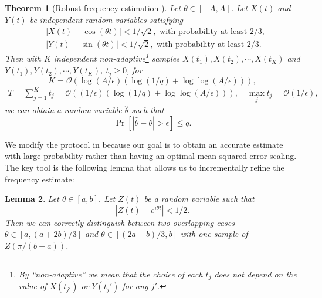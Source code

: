\documentclass[twocolumn,superscriptaddress,aps,showpacs,amsmath,amstex,amssymb,citeautoscript,floatfix,pra,preprintnumbers]{revtex4-2}
\newtheorem{theorem}{Theorem}
\newtheorem{lemma}[theorem]{Lemma}
\theoremstyle{plain}
\theoremstyle{plain}
\theoremstyle{plain}
\theoremstyle{plain}
\theoremstyle{plain}
\theoremstyle{plain}
\begin{document}
\begin{appendix}
\begin{theorem}[Robust frequency estimation \cite{ma2024learningkbodyhamiltonianscompressed}]
    \label{thm:robust_frequency_estimation}
    Let $\theta\in[-A,A]$.
    Let $X(t)$ and $Y(t)$ be independent random variables satisfying
    \begin{equation}
        \begin{aligned}
            &|X(t)-\cos(\theta t)|< 1/\sqrt{2}, \text{ with probability at least }2/3, \\
            &|Y(t)-\sin(\theta t)|< 1/\sqrt{2}, \text{ with probability at least }2/3.
        \end{aligned}
    \end{equation}
    Then with $K$ independent non-adaptive\footnote{By ``non-adaptive'' we mean that the choice of each $t_j$ does not depend on the value of $X(t_{j'})$ or $Y(t_j')$ for any $j'$.} samples $X(t_1),X(t_2),\cdots,X(t_K)$ and $Y(t_1),Y(t_2),\cdots,Y(t_K)$, $t_j\geq 0$, for
    \begin{equation}
        K=\mathcal{O}(\log(A/\epsilon)(\log(1/q)+\log\log(A/\epsilon))),
    \end{equation}
    \begin{equation}
    \begin{aligned}
        T=\sum_{j=1}^Kt_j=\mathcal{O}((1/\epsilon)(\log(1/q)+\log\log(A/\epsilon))),\quad \max_j t_j=\mathcal{O}(1/\epsilon),
    \end{aligned}
    \end{equation}
    we can obtain a random variable $\hat{\theta}$ such that
    \begin{equation}
        \Pr[|\hat{\theta}-\theta|>\epsilon]\leq q.
    \end{equation}
\end{theorem}


We modify the protocol in \cite{LiTongNiGefenYing2023heisenberg} because our goal is to obtain an accurate estimate with large probability rather than having an optimal mean-squared error scaling.
The key tool is the following lemma that allows us to incrementally refine the frequency estimate:

\begin{lemma}
    \label{lem:frequency_est_refine}
    Let $\theta\in[a,b]$.
    Let $Z(t)$ be a random variable such that 
    \begin{equation}
        \label{eq:rv_correctness_condition}
        |Z(t)-e^{i\theta t}|< 1/2.
    \end{equation}
    Then we can correctly distinguish between two overlapping cases $\theta\in[a,(a+2b)/3]$ and $\theta\in[(2a+b)/3,b]$ with one sample of $Z(\pi/(b-a))$. 
\end{lemma}


\end{appendix}
\end{document}
